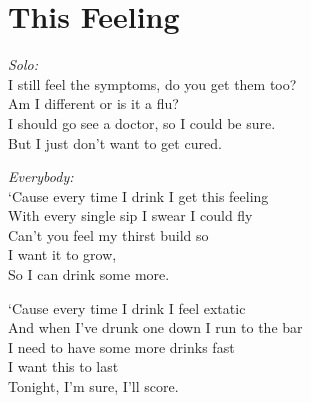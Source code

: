 \section{This Feeling}

\textit{Solo:}\\
I still feel the symptoms, do you get them too?\\
Am I different or is it a flu?\\
I should go see a doctor, so I could be sure.\\
But I just don’t want to get cured.

\textit{Everybody:}\\
‘Cause every time I drink I get this feeling\\
With every single sip I swear I could fly\\
Can’t you feel my thirst build so\\
I want it to grow,\\
So I can drink some more.

‘Cause every time I drink I feel extatic\\
And when I’ve drunk one down I run to the bar\\
I need to have some more drinks fast\\
I want this to last\\
Tonight, I’m sure, I’ll score.